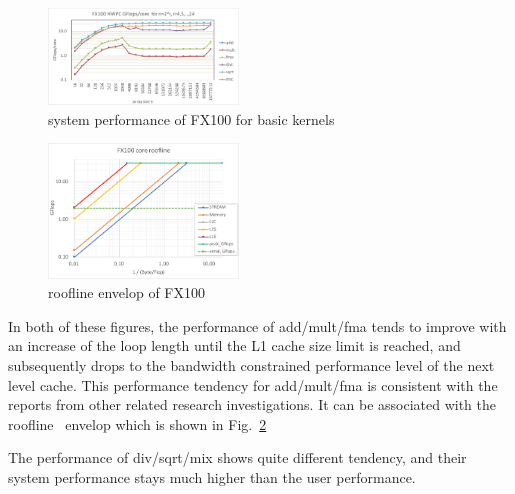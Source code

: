 \documentclass[conference]{IEEEtran}
\begin{document}
\begin{figure}[tb]
\centering
\includegraphics[width=0.45\textwidth]{figs/fx100-gflops-system-long-R8.pdf}
\caption{system performance of FX100 for basic kernels}
\label{fig:fx100-gflops-system-long-R8}
\end{figure}

\begin{figure}[tb]
\includegraphics[width=0.45\textwidth]{figs/roofline-fx100.pdf}
\caption{roofline envelop of FX100}
\label{fig:roofline-fx100}
\end{figure}

In both of these figures,
the performance of add/mult/fma tends to improve with an increase of
the loop length until the L1 cache size limit is reached,
and subsequently drops to the bandwidth constrained performance level
of the next level cache.
This performance tendency for add/mult/fma is consistent with the reports
from other related research investigations.
It can be associated with the roofline~\cite{Williams:2009}
envelop which is shown in Fig.~\ref{fig:roofline-fx100}

The performance of div/sqrt/mix shows quite different tendency, and
their system performance stays much higher than the user performance.
\end{document}
